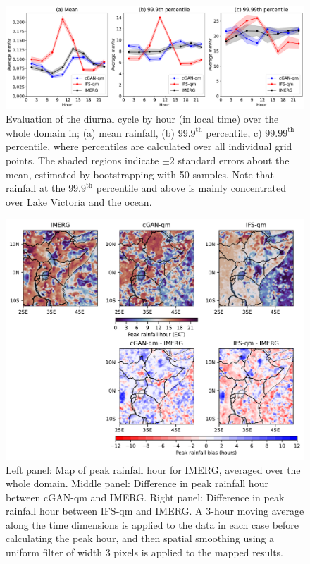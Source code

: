\documentclass{article}
\begin{document}
\begin{figure}
    \includegraphics[width=\textwidth]{images/diurnal_cycle_final-nologs_217600.pdf}
    \centering
     \caption{Evaluation of the diurnal cycle by hour (in local time) over the whole domain in; (a) mean rainfall, (b) $99.9^{\text{th}}$ percentile, c) $99.99^{\text{th}}$ percentile, where percentiles are calculated over all individual grid points. The shaded regions indicate $\pm2$ standard errors about the mean, estimated by bootstrapping with 50 samples. Note that rainfall at the $99.9^{\text{th}}$ percentile and above is mainly concentrated over Lake Victoria and the ocean.}
     \label{fig:diurnal}
\end{figure}

\begin{figure}
\centering
        \includegraphics[width=\textwidth]{images/diurnal_cycle_map_All_final-nologs_217600.pdf}

     \caption{Left panel: Map of peak rainfall hour for IMERG, averaged over the whole domain. Middle panel: Difference in peak rainfall hour between cGAN-qm and IMERG. Right panel: Difference in peak rainfall hour between IFS-qm and IMERG. A 3-hour moving average along the time dimensions is applied to the data in each case before calculating the peak hour, and then spatial smoothing using a uniform filter of width 3 pixels is applied to the mapped results.}
     \label{fig:peak_hour}
\end{figure}
\end{document}
